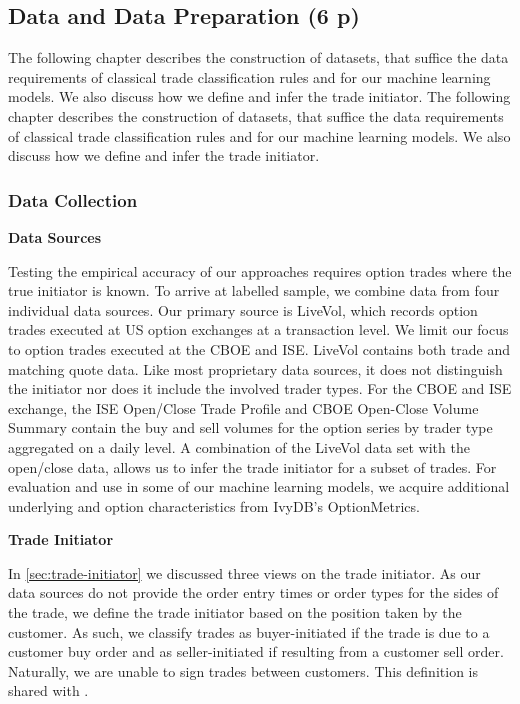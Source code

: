 \subsection{Data and Data Preparation (6 p)}\label{sec:data-and-data-preparation}

The following chapter describes the construction of datasets, that suffice the data requirements of classical trade classification rules and for our machine learning models. We also discuss how we define and infer the trade initiator.
The following chapter describes the construction of datasets, that suffice the data requirements of classical trade classification rules and for our machine learning models. We also discuss how we define and infer the trade initiator.

\subsubsection{Data Collection}\label{sec:data-collection}

\textbf{Data Sources}

Testing the empirical accuracy of our approaches requires option trades where the true initiator is known. To arrive at labelled sample, we combine data from four individual data sources. Our primary source is LiveVol, which records option trades executed at US option exchanges at a transaction level. We limit our focus to option trades executed at the \gls{CBOE} and \gls{ISE}. LiveVol contains both trade and matching quote data. Like most proprietary data sources, it does not distinguish the initiator nor does it include the involved trader types. For the \gls{CBOE} and \gls{ISE} exchange, the \gls{ISE} Open/Close Trade Profile and \gls{CBOE} Open-Close Volume Summary contain the buy and sell volumes for the option series by trader type aggregated on a daily level. A combination of the LiveVol data set with the open/close data, allows us to infer the trade initiator for a subset of trades. For evaluation and use in some of our machine learning models, we acquire additional underlying and option characteristics from IvyDB's OptionMetrics.

\textbf{Trade Initiator}

In \cref{sec:trade-initiator} we discussed three views on the trade initiator. As our data sources do not provide the order entry times or order types for the sides of the trade, we define the trade initiator based on the position taken by the customer. As such, we classify trades as buyer-initiated if the trade is due to a customer buy order and as seller-initiated if resulting from a customer sell order. Naturally, we are unable to sign trades between customers. This definition is shared with \textcite[][8]{grauerOptionTradeClassification2022}.

